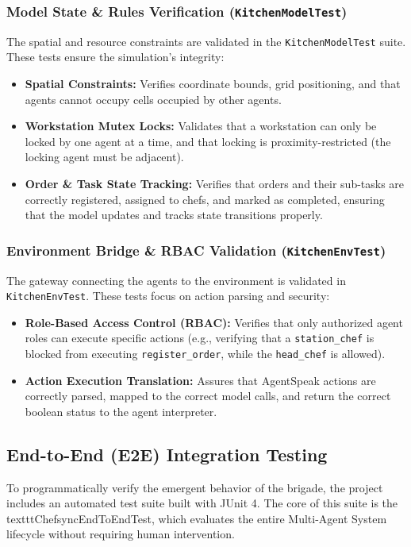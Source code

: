 \documentclass{scrartcl}
\begin{document}
\subsubsection{Model State \& Rules Verification (\texttt{KitchenModelTest})}
The spatial and resource constraints are validated in the \texttt{KitchenModelTest} suite. These tests ensure the simulation's integrity:
\begin{itemize}
\item \textbf{Spatial Constraints:} Verifies coordinate bounds, grid positioning, and that agents cannot occupy cells occupied by other agents.
\item \textbf{Workstation Mutex Locks:} Validates that a workstation can only be locked by one agent at a time, and that locking is proximity-restricted (the locking agent must be adjacent).
\item \textbf{Order \& Task State Tracking:} Verifies that orders and their sub-tasks are correctly registered, assigned to chefs, and marked as completed, ensuring that the model updates and tracks state transitions properly.
\end{itemize}

\subsubsection{Environment Bridge \& RBAC Validation (\texttt{KitchenEnvTest})}
The gateway connecting the agents to the environment is validated in \texttt{KitchenEnvTest}. These tests focus on action parsing and security:
\begin{itemize}
\item \textbf{Role-Based Access Control (RBAC):} Verifies that only authorized agent roles can execute specific actions (e.g., verifying that a \texttt{station\_chef} is blocked from executing \texttt{register\_order}, while the \texttt{head\_chef} is allowed).
\item \textbf{Action Execution Translation:} Assures that AgentSpeak actions are correctly parsed, mapped to the correct model calls, and return the correct boolean status to the agent interpreter.
\end{itemize}


\subsection{End-to-End (E2E) Integration Testing}

To programmatically verify the emergent behavior of the brigade, the project includes an automated test suite built with JUnit 4. The core of this suite is the \\texttt{ChefsyncEndToEndTest}, which evaluates the entire Multi-Agent System lifecycle without requiring human intervention.
\end{document}
